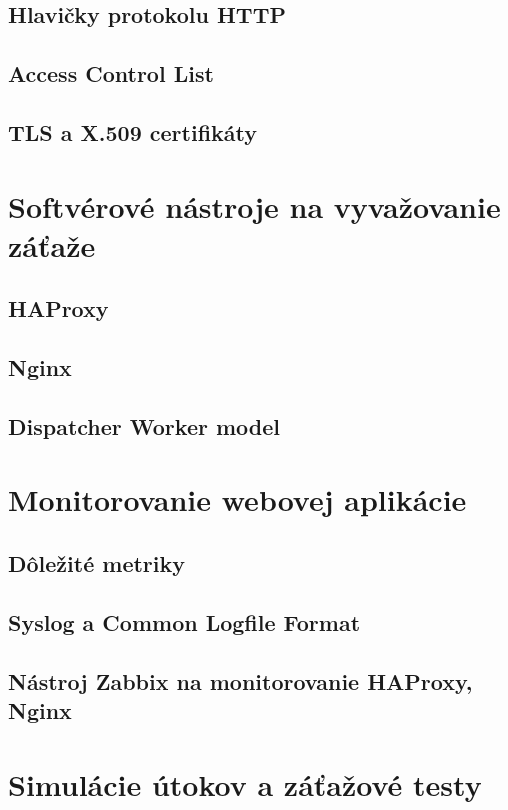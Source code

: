 \documentclass[11pt, a4paper]{article}
\begin{document}
\subsection{Hlavičky protokolu HTTP}


\subsection{Access Control List}

\subsection{TLS a X.509 certifikáty}


\section{Softvérové nástroje na vyvažovanie záťaže}

\subsection{HAProxy}

\subsection{Nginx}

\subsection{Dispatcher Worker model}


\section{Monitorovanie webovej aplikácie}


\subsection{Dôležité metriky}

\subsection{Syslog a Common Logfile Format}

\subsection{Nástroj Zabbix na monitorovanie HAProxy, Nginx}

\section{Simulácie útokov a záťažové testy}


\printbibliography[title={Literatúra}]
\end{document}
